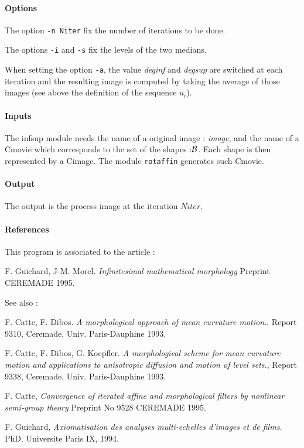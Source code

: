 \paragraph{Options} \mbox{}

The option \verb+-n Niter+ fix the number of iterations to be done. 

The options \verb+-i+ and \verb+-s+ fix the levels of the two medians.

When setting the option \verb+-a+, the value  {\it deginf} and {\it degsup} are switched 
at each iteration and the resulting image is computed by taking the average of those
images (see above the definition of the sequence $u_i$).

\paragraph{Inputs} \mbox{}

The infsup module needs the name of a original image : {\it image}, and the
name of a Cmovie which corresponds to the set of the shapes :$\cal B$. Each shape is then represented by a Cimage.
The module \verb+rotaffin+ generates such Cmovie.

\paragraph{Output} \mbox{}

The output is the process image at the iteration $Niter$.


\paragraph{References} \mbox{}

This program is associated to the article :

F. Guichard, J-M. Morel. {\em Infinitesimal mathematical morphology}
Preprint CEREMADE 1995.

See also :

F. Catte, F. Dibos. {\em A morphological approach of mean curvature motion.}, Report 9310, Ceremade, Univ. Paris-Dauphine 1993.

F. Catte, F. Dibos, G. Koepfler. {\em A morphological scheme for mean curvature motion and applications to anisotropic diffusion and motion of level sets.}, Report 9338, Ceremade, Univ. Paris-Dauphine 1993.

F. Catte, {\em Convergence of iterated affine and morphological filters by nonlinear semi-group theory} Preprint No 9528 CEREMADE 1995.

F. Guichard, {\em Axiomatisation des analyses multi-echelles d'images et de films.} PhD. Universite Paris IX, 1994.














